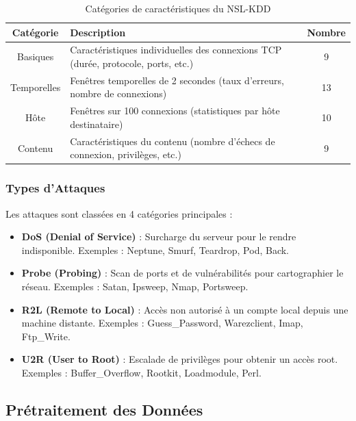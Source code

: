 \documentclass[12pt,a4paper]{article}
\begin{document}
\begin{table}[H]
    \centering
    \caption{Catégories de caractéristiques du NSL-KDD}
    \label{tab:features}
    \begin{tabularx}{\textwidth}{c X c}
        \toprule
        \rowcolor{blue!10}
        \textbf{Catégorie} & \textbf{Description} & \textbf{Nombre} \\
        \midrule
        Basiques & Caractéristiques individuelles des connexions TCP (durée, protocole, ports, etc.) & 9 \\
        Temporelles & Fenêtres temporelles de 2 secondes (taux d'erreurs, nombre de connexions) & 13 \\
        Hôte & Fenêtres sur 100 connexions (statistiques par hôte destinataire) & 10 \\
        Contenu & Caractéristiques du contenu (nombre d'échecs de connexion, privilèges, etc.) & 9 \\
        \bottomrule
    \end{tabularx}
\end{table}

\subsubsection{Types d'Attaques}

Les attaques sont classées en 4 catégories principales :

\begin{itemize}
    \item \textbf{DoS (Denial of Service)} : Surcharge du serveur pour le rendre indisponible. Exemples : Neptune, Smurf, Teardrop, Pod, Back.
    \item \textbf{Probe (Probing)} : Scan de ports et de vulnérabilités pour cartographier le réseau. Exemples : Satan, Ipsweep, Nmap, Portsweep.
    \item \textbf{R2L (Remote to Local)} : Accès non autorisé à un compte local depuis une machine distante. Exemples : Guess\_Password, Warezclient, Imap, Ftp\_Write.
    \item \textbf{U2R (User to Root)} : Escalade de privilèges pour obtenir un accès root. Exemples : Buffer\_Overflow, Rootkit, Loadmodule, Perl.
\end{itemize}

\subsection{Prétraitement des Données}
\end{document}
